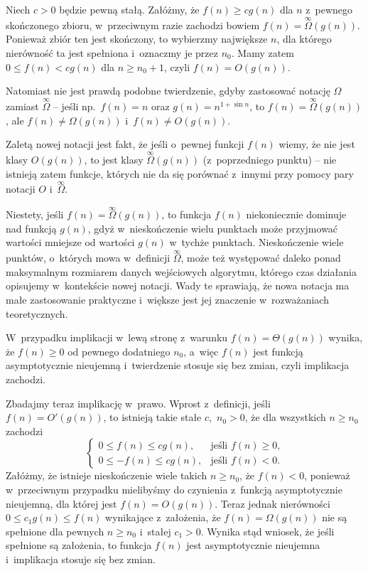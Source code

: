 
\subproblem %
Niech $c>0$ będzie pewną stałą. Załóżmy, że $f(n)\ge cg(n)$ dla $n$ z~pewnego skończonego zbioru, w~przeciwnym razie zachodzi bowiem $f(n)=\overset{\infty}{\Omega}(g(n))$. Ponieważ zbiór ten jest skończony, to wybierzmy największe $n$, dla którego nierówność ta jest spełniona i~oznaczmy je przez $n_0$. Mamy zatem $0\le f(n)<cg(n)$ dla $n\ge n_0+1$, czyli $f(n)=O(g(n))$.

Natomiast nie jest prawdą podobne twierdzenie, gdyby zastosować notację $\Omega$ zamiast $\overset{\infty}{\Omega}$ -- jeśli np.\ $f(n)=n$ oraz $g(n)=n^{1+\sin n}$, to $f(n)=\overset{\infty}{\Omega}(g(n))$, ale $f(n)\ne\Omega(g(n))$ i~$f(n)\ne O(g(n))$.

\subproblem %
Zaletą nowej notacji jest fakt, że jeśli o~pewnej funkcji $f(n)$ wiemy, że nie jest klasy $O(g(n))$, to jest klasy $\overset{\infty}{\Omega}(g(n))$ (z~poprzedniego punktu) -- nie istnieją zatem funkcje, których nie da się porównać z~innymi przy pomocy pary notacji $O$ i~$\overset{\infty}{\Omega}$.

Niestety, jeśli $f(n)=\overset{\infty}{\Omega}(g(n))$, to funkcja $f(n)$ niekoniecznie dominuje nad funkcją $g(n)$, gdyż w~nieskończenie wielu punktach może przyjmować wartości mniejsze od wartości $g(n)$ w~tychże punktach. Nieskończenie wiele punktów, o~których mowa w~definicji $\overset{\infty}{\Omega}$, może też występować daleko ponad maksymalnym rozmiarem danych wejściowych algorytmu, którego czas działania opisujemy w~kontekście nowej notacji. Wady te sprawiają, że nowa notacja ma małe zastosowanie praktyczne i~większe jest jej znaczenie w~rozważaniach teoretycznych.

\subproblem %
W~przypadku implikacji w~lewą stronę z~warunku $f(n)=\Theta(g(n))$ wynika, że $f(n)\ge0$ od pewnego dodatniego $n_0$, a~więc $f(n)$ jest funkcją asymptotycznie nieujemną i~twierdzenie stosuje się bez zmian, czyli implikacja zachodzi.

Zbadajmy teraz implikację w~prawo. Wprost z~definicji, jeśli $f(n)=O'(g(n))$, to istnieją takie stałe $c$,~$n_0>0$, że dla wszystkich $n\ge n_0$ zachodzi
\[
	\begin{cases}
		0 \le f(n) \le cg(n), & \text{jeśli $f(n)\ge0$,} \\
		0 \le -f(n) \le cg(n), & \text{jeśli $f(n)<0$.}
	\end{cases}
\]
Załóżmy, że istnieje nieskończenie wiele takich $n\ge n_0$, że $f(n)<0$, ponieważ w~przeciwnym przypadku mielibyśmy do czynienia z~funkcją asymptotycznie nieujemną, dla której jest $f(n)=O(g(n))$. Teraz jednak nierówności $0\le c_1g(n)\le f(n)$ wynikające z~założenia, że $f(n)=\Omega(g(n))$ nie są spełnione dla pewnych $n\ge n_0$ i~stałej $c_1>0$. Wynika stąd wniosek, że jeśli spełnione są założenia, to funkcja $f(n)$ jest asymptotycznie nieujemna i~implikacja stosuje się bez zmian.

